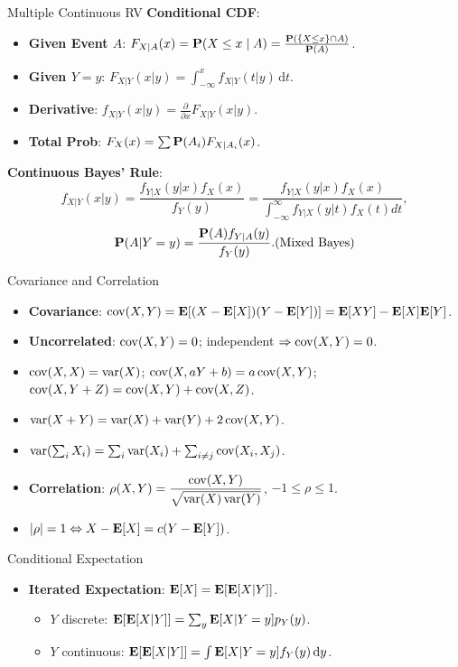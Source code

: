 \documentclass[landscape,a4paper]{article}
\begin{document}
\begin{cheatsheetcolumns}
\begin{card}{Multiple Continuous RV}
			\textbf{Conditional CDF}: 
			\begin{itemize}
				\item \textbf{Given Event $A$}: $F_{X|A}(x) = \mathbf{P}(X \le x \mid A) = \frac{\mathbf{P}(\{X \le x\} \cap A)}{\mathbf{P}(A)}$.
				\item \textbf{Given $Y=y$}: $F_{X|Y}(x|y) = \int_{-\infty}^{x} f_{X|Y}(t|y) \,\mathrm dt$.
				\item \textbf{Derivative}: $f_{X|Y}(x|y) = \frac{\partial}{\partial x} F_{X|Y}(x|y)$.
				\item \textbf{Total Prob}: $F_X(x) = \sum \mathbf{P}(A_i) F_{X|A_i}(x)$.
			\end{itemize}
			\textbf{Continuous Bayes' Rule}:
			\[
			f_{X | Y}(x | y)=\frac{f_{Y | X}(y | x) f_X(x)}{f_Y(y)}=\frac{f_{Y | X}(y | x) f_X(x)}{\int_{-\infty}^{\infty} f_{Y | X}(y | t) f_X(t) d t},
			\]
			\[\mathbf{P}(A|Y=y) = \frac{\mathbf{P}(A) f_{Y|A}(y)}{f_Y(y)}. (\text{Mixed Bayes})\]
		\end{card}
		\begin{card}{Covariance and Correlation}
			\begin{itemize}
				\item \textbf{Covariance}: $\operatorname{cov}(X,Y)=\mathbf{E}[(X-\mathbf{E}[X])(Y-\mathbf{E}[Y])]=\mathbf{E}[XY]-\mathbf{E}[X]\mathbf{E}[Y]$.
				\item \textbf{Uncorrelated}: $\operatorname{cov}(X,Y)=0$; independent $\Rightarrow\operatorname{cov}(X,Y)=0$.
				\item $\operatorname{cov}(X,X)=\operatorname{var}(X)$; $\operatorname{cov}(X,aY+b)=a\operatorname{cov}(X,Y)$; $\operatorname{cov}(X,Y+Z)=\operatorname{cov}(X,Y)+\operatorname{cov}(X,Z)$.
				\item $\operatorname{var}(X+Y)=\operatorname{var}(X)+\operatorname{var}(Y)+2\operatorname{cov}(X,Y)$.
				\item $\operatorname{var}(\sum_iX_i)=\sum_i\operatorname{var}(X_i)+\sum_{i\neq j}\operatorname{cov}(X_i,X_j)$.
				\item \textbf{Correlation}: $\rho(X,Y)=\dfrac{\operatorname{cov}(X,Y)}{\sqrt{\operatorname{var}(X)\operatorname{var}(Y)}}$, $-1\le\rho\le1$.
				\item $|\rho|=1\Leftrightarrow X-\mathbf{E}[X]=c(Y-\mathbf{E}[Y])$.
			\end{itemize}
		\end{card}
		\begin{card}{Conditional Expectation}
			\begin{itemize}
				\item \textbf{Iterated Expectation}: $\mathbf{E}[X]=\mathbf{E}[\mathbf{E}[X|Y]]$.
				\begin{itemize}
					\item $Y$ discrete: $\mathbf{E}[\mathbf{E}[X|Y]]=\sum_y\mathbf{E}[X|Y=y]p_Y(y)$.
					\item $Y$ continuous: $\mathbf{E}[\mathbf{E}[X|Y]]=\int\mathbf{E}[X|Y=y]f_Y(y)\,\mathrm dy$.

\end{itemize}
\end{itemize}
\end{card}
\end{cheatsheetcolumns}
\end{document}
